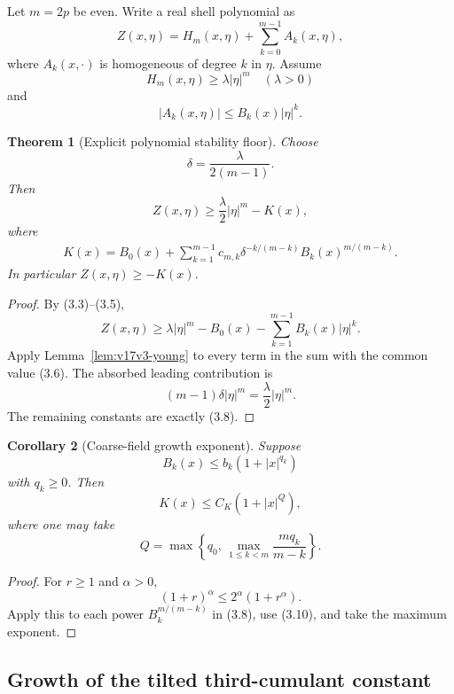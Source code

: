 \documentclass[11pt]{article}
\newtheorem{theorem}{Theorem}[section]
\newtheorem{corollary}[theorem]{Corollary}
\theoremstyle{remark}
\begin{document}
Let \(m=2p\) be even.  Write a real shell polynomial as
\[
 Z(x,\eta)
 =
 H_m(x,\eta)+
 \sum_{k=0}^{m-1}A_k(x,\eta),                       \tag{3.3}
\]
where \(A_k(x,\cdot)\) is homogeneous of degree \(k\) in \(\eta\).
Assume
\[
 H_m(x,\eta)\geq\lambda|\eta|^m
 \quad(\lambda>0)                                   \tag{3.4}
\]
and
\[
 |A_k(x,\eta)|
 \leq B_k(x)|\eta|^k.                               \tag{3.5}
\]

\begin{theorem}[Explicit polynomial stability floor]
\label{thm:v17v3-stability}
Choose
\[
 \delta=\frac{\lambda}{2(m-1)}.                     \tag{3.6}
\]
Then
\[
 Z(x,\eta)
 \geq
 \frac{\lambda}{2}|\eta|^m-K(x),                   \tag{3.7}
\]
where
\[
\begin{split}
 K(x)
 =
 B_0(x)+
 \sum_{k=1}^{m-1}
 c_{m,k}\delta^{-k/(m-k)}
 B_k(x)^{m/(m-k)}.                                 \tag{3.8}
\end{split}
\]
In particular \(Z(x,\eta)\geq-K(x)\).
\end{theorem}

\begin{proof}
By (3.3)--(3.5),
\[
 Z(x,\eta)
 \geq
 \lambda|\eta|^m-B_0(x)
 -\sum_{k=1}^{m-1}B_k(x)|\eta|^k.                  \tag{3.9}
\]
Apply Lemma~\ref{lem:v17v3-young} to every term in the sum with the
common value (3.6).  The absorbed leading contribution is
\[
 (m-1)\delta|\eta|^m=\frac{\lambda}{2}|\eta|^m.
\]
The remaining constants are exactly (3.8).
\end{proof}

\begin{corollary}[Coarse-field growth exponent]
\label{cor:v17v3-growth}
Suppose
\[
 B_k(x)\leq b_k(1+|x|^{q_k})                       \tag{3.10}
\]
with \(q_k\geq0\).  Then
\[
 K(x)\leq C_K(1+|x|^Q),                            \tag{3.11}
\]
where one may take
\[
 Q=
 \max\left\{
 q_0,\,
 \max_{1\leq k<m}\frac{mq_k}{m-k}
 \right\}.                                         \tag{3.12}
\]
\end{corollary}

\begin{proof}
For \(r\geq1\) and \(\alpha>0\),
\[
 (1+r)^\alpha\leq2^\alpha(1+r^\alpha).
\]
Apply this to each power
\(B_k^{m/(m-k)}\) in (3.8), use (3.10), and take the maximum exponent.
\end{proof}

\subsection{Growth of the tilted third-cumulant constant}
\end{document}
